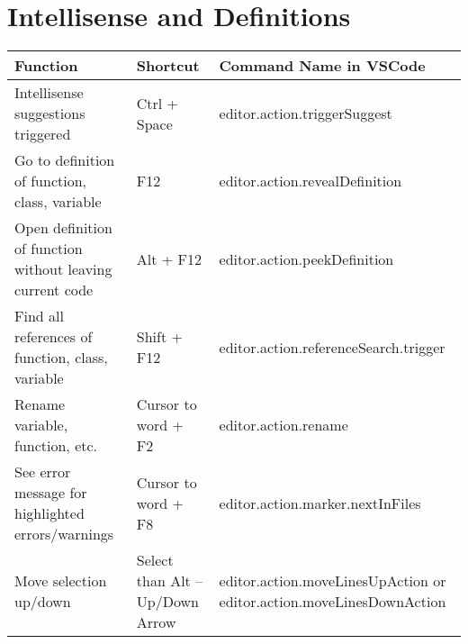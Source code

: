 \documentclass{article}
\begin{document}
\section*{Intellisense and Definitions}
\begin{longtable}{|p{6cm}|p{3cm}|p{7cm}|}
\hline
\rowcolor{white}
\textbf{Function} & \textbf{Shortcut} & \textbf{Command Name in VSCode} \\
\hline
Intellisense suggestions triggered & Ctrl + Space & editor.action.triggerSuggest \\
Go to definition of function, class, variable & F12 & editor.action.revealDefinition \\
Open definition of function without leaving current code & Alt + F12 & editor.action.peekDefinition \\
Find all references of function, class, variable & Shift + F12 & editor.action.referenceSearch.trigger \\
Rename variable, function, etc. & Cursor to word + F2 & editor.action.rename \\
See error message for highlighted errors/warnings & Cursor to word + F8 & editor.action.marker.nextInFiles \\
Move selection up/down & Select than Alt – Up/Down Arrow & editor.action.moveLinesUpAction or editor.action.moveLinesDownAction \\
\hline
\end{longtable}
\end{document}
